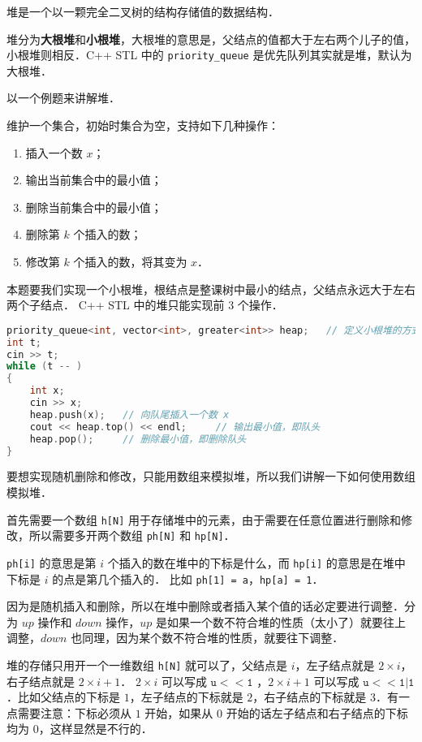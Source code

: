 
堆是一个以一颗完全二叉树的结构存储值的数据结构．

堆分为\textbf{大根堆}和\textbf{小根堆}，大根堆的意思是，父结点的值都大于左右两个儿子的值，小根堆则相反．C++ STL 中的 \verb|priority_queue| 是优先队列其实就是堆，默认为大根堆．

以一个例题来讲解堆．

维护一个集合，初始时集合为空，支持如下几种操作：
\begin{enumerate}
\item 插入一个数 $x$；
\item 输出当前集合中的最小值；
\item 删除当前集合中的最小值；
\item 删除第 $k$ 个插入的数；
\item 修改第 $k$ 个插入的数，将其变为 $x$．
\end{enumerate}

本题要我们实现一个小根堆，根结点是整课树中最小的结点，父结点永远大于左右两个子结点．
C++ STL 中的堆只能实现前 $3$ 个操作．
\begin{lstlisting}[language=cpp]
priority_queue<int, vector<int>, greater<int>> heap;   // 定义小根堆的方式
int t;
cin >> t;
while (t -- )
{
    int x;            
    cin >> x;
    heap.push(x);   // 向队尾插入一个数 x
    cout << heap.top() << endl;     // 输出最小值，即队头
    heap.pop();     // 删除最小值，即删除队头
}
\end{lstlisting}

要想实现随机删除和修改，只能用数组来模拟堆，所以我们讲解一下如何使用数组模拟堆．

首先需要一个数组 \verb|h[N]| 用于存储堆中的元素，由于需要在任意位置进行删除和修改，所以需要多开两个数组 \verb|ph[N]| 和 \verb|hp[N]|．

\verb|ph[i]| 的意思是第 $i$ 个插入的数在堆中的下标是什么，而 \verb|hp[i]| 的意思是在堆中下标是 $i$ 的点是第几个插入的．
比如 \verb|ph[1] = a|，\verb|hp[a] = 1|．

因为是随机插入和删除，所以在堆中删除或者插入某个值的话必定要进行调整．分为 $up$ 操作和 $down$ 操作，$up$ 是如果一个数不符合堆的性质（太小了）就要往上调整，$down$ 也同理，因为某个数不符合堆的性质，就要往下调整．

堆的存储只用开一个一维数组 \verb|h[N]| 就可以了，父结点是 $i$，左子结点就是 $2 \times i$，右子结点就是 $2 \times i + 1$．
$2 \times i$ 可以写成 $\mathtt{u << 1}$ ，$2 \times i + 1$ 可以写成 $\mathtt{u << 1 | 1}$．比如父结点的下标是 $1$，左子结点的下标就是 $2$，右子结点的下标就是 $3$．有一点需要注意：下标必须从 $1$ 开始，如果从 $0$ 开始的话左子结点和右子结点的下标均为 $0$，这样显然是不行的．

